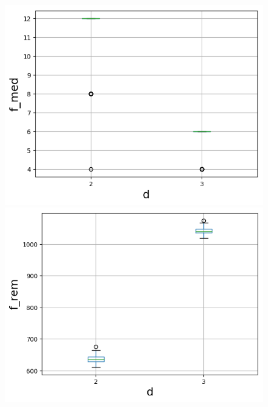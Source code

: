 \begin{figure}[H]
	\hspace*{-1.1cm}
    \begin{minipage}[t]{.30\textwidth}
        \centering
		\includegraphics[width=1.15\textwidth]{pictures/med_algo_theo28_comp_med}
    \end{minipage}
    \hspace*{.6cm}
    \begin{minipage}[t]{.30\textwidth}
        \centering
        \includegraphics[width=1.2\textwidth]{pictures/med_algo_theo28_comp_rem}
    \end{minipage}

\end{figure}
